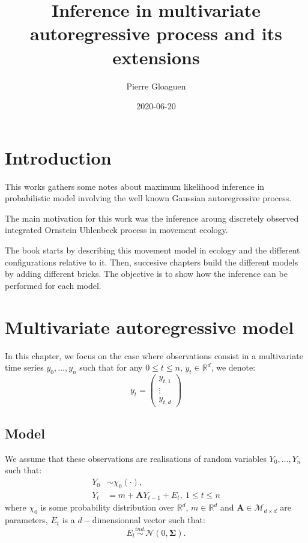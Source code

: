 \documentclass[]{book}
\title{Inference in multivariate autoregressive process and its extensions}
\author{Pierre Gloaguen}
\date{2020-06-20}
\begin{document}
\maketitle

{
\setcounter{tocdepth}{1}
\tableofcontents
}
\hypertarget{intro}{%
\chapter{Introduction}\label{intro}}

This works gathers some notes about maximum likelihood inference in probabilistic model involving the well known Gaussian autoregressive process.

The main motivation for this work was the inference aroung discretely observed integrated Ornstein Uhlenbeck process in movement ecology.

The book starts by describing this movement model in ecology and the different configurations relative to it. Then, succesive chapters build the different models by adding different bricks.
The objective is to show how the inference can be performed for each model.

\hypertarget{simpleAR}{%
\chapter{Multivariate autoregressive model}\label{simpleAR}}

In this chapter, we focus on the case where observations consist in a multivariate time series \(y_0, \dots, y_n\) such that for any \(0\leq t \leq n\), \(y_t \in \mathbb{R}^d\), we denote:
\[y_t = 
\begin{pmatrix}
y_{t,1}\\
\vdots\\
y_{t, d}
\end{pmatrix}\]

\hypertarget{model}{%
\section{Model}\label{model}}

We assume that these observations are realisations of random variables \(Y_0,\dots, Y_n\) such that:
\begin{align}
Y_0 &\sim \chi_0(\cdot),\nonumber \\
Y_t &= m + \mathbf{A}Y_{t -1} + E_t,~1\leq t \leq n \label{eq:AR-simple}
\end{align}
where \(\chi_0\) is some probability distribution over \(\mathbb{R}^d\), \(m\in\mathbb{R}^d\) and \(\mathbf{A}\in \mathcal{M}_{d\times d}\) are parameters, \(E_t\) is a \(d-\)dimensionnal vector such that:
\begin{equation*}
E_t \overset{ind.}{\sim} \mathcal{N}\left(0, \mathbf{\Sigma}\right).
\end{equation*}
\end{document}
